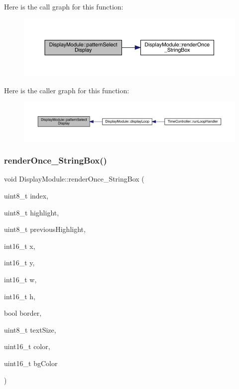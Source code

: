 Here is the call graph for this function\+:
\nopagebreak
\begin{figure}[H]
\begin{center}
\leavevmode
\includegraphics[width=350pt]{class_display_module_a95fa96a6b2d74b8d15eeb0c71786b1b2_cgraph}
\end{center}
\end{figure}
Here is the caller graph for this function\+:
\nopagebreak
\begin{figure}[H]
\begin{center}
\leavevmode
\includegraphics[width=350pt]{class_display_module_a95fa96a6b2d74b8d15eeb0c71786b1b2_icgraph}
\end{center}
\end{figure}
\mbox{\label{class_display_module_a453ceefb9e2a9a82dd7b62825cc2cac8}} 
\subsubsection{\texorpdfstring{render\+Once\+\_\+\+String\+Box()}{renderOnce\_StringBox()}}
{\footnotesize\ttfamily void Display\+Module\+::render\+Once\+\_\+\+String\+Box (\begin{DoxyParamCaption}\item[{uint8\+\_\+t}]{index,  }\item[{uint8\+\_\+t}]{highlight,  }\item[{uint8\+\_\+t}]{previous\+Highlight,  }\item[{int16\+\_\+t}]{x,  }\item[{int16\+\_\+t}]{y,  }\item[{int16\+\_\+t}]{w,  }\item[{int16\+\_\+t}]{h,  }\item[{bool}]{border,  }\item[{uint8\+\_\+t}]{text\+Size,  }\item[{uint16\+\_\+t}]{color,  }\item[{uint16\+\_\+t}]{bg\+Color }\end{DoxyParamCaption})}

